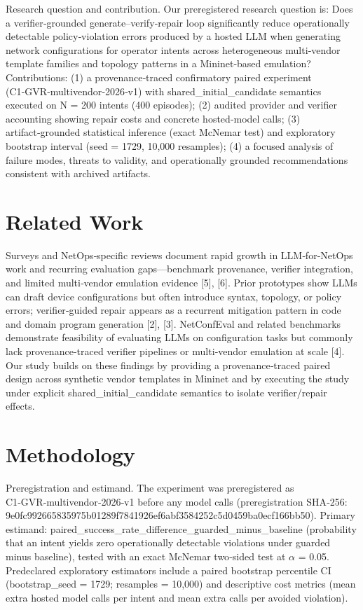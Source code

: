 \documentclass[conference]{IEEEtran}
\begin{document}
Research question and contribution. Our preregistered research question is: Does a verifier‑grounded generate--verify‑repair loop significantly reduce operationally detectable policy‑violation errors produced by a hosted LLM when generating network configurations for operator intents across heterogeneous multi‑vendor template families and topology patterns in a Mininet‑based emulation? Contributions: (1) a provenance‑traced confirmatory paired experiment (C1‑GVR‑multivendor‑2026‑v1) with shared\_initial\_candidate semantics executed on N = 200 intents (400 episodes); (2) audited provider and verifier accounting showing repair costs and concrete hosted‑model calls; (3) artifact‑grounded statistical inference (exact McNemar test) and exploratory bootstrap interval (seed = 1729, 10,000 resamples); (4) a focused analysis of failure modes, threats to validity, and operationally grounded recommendations consistent with archived artifacts.

\section{Related Work}
Surveys and NetOps‑specific reviews document rapid growth in LLM‑for‑NetOps work and recurring evaluation gaps---benchmark provenance, verifier integration, and limited multi‑vendor emulation evidence [5], [6]. Prior prototypes show LLMs can draft device configurations but often introduce syntax, topology, or policy errors; verifier‑guided repair appears as a recurrent mitigation pattern in code and domain program generation [2], [3]. NetConfEval and related benchmarks demonstrate feasibility of evaluating LLMs on configuration tasks but commonly lack provenance‑traced verifier pipelines or multi‑vendor emulation at scale [4]. Our study builds on these findings by providing a provenance‑traced paired design across synthetic vendor templates in Mininet and by executing the study under explicit shared\_initial\_candidate semantics to isolate verifier/repair effects.

\section{Methodology}
Preregistration and estimand. The experiment was preregistered as C1‑GVR‑multivendor‑2026‑v1 before any model calls (preregistration SHA‑256: 9e0fc992\allowbreak{}66583597\allowbreak{}5b01289f\allowbreak{}7841926e\allowbreak{}f6abf358\allowbreak{}4252c5d0\allowbreak{}459ba0ec\allowbreak{}f166bb50). Primary estimand: paired\_success\_rate\_difference\_guarded\_minus\_baseline (probability that an intent yields zero operationally detectable violations under guarded minus baseline), tested with an exact McNemar two‑sided test at \ensuremath{\alpha} = 0.05. Predeclared exploratory estimators include a paired bootstrap percentile CI (bootstrap\_seed = 1729; resamples = 10,000) and descriptive cost metrics (mean extra hosted model calls per intent and mean extra calls per avoided violation).
\end{document}
